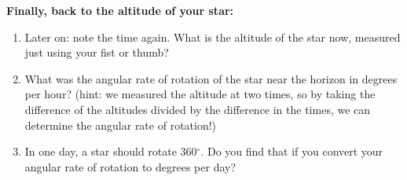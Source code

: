 \documentclass[11pt]{article}
\begin{document}
\medskip \noindent
\textbf{Finally, back to the altitude of your star:}

\begin{enumerate}[resume]
    \item Later on: note the time again. What is the altitude of the star now, measured just using your fist or thumb?
    
    \item What was the angular rate of rotation of the star near the horizon in degrees per hour? (hint: we measured the altitude at two times, so by taking the difference of the altitudes divided by the difference in the times, we can determine the angular rate of rotation!)
    
    \item In one day, a star should rotate 360$^{\circ}$. Do you find that if you convert your angular rate of rotation to degrees per day?
\end{enumerate}
\end{document}
